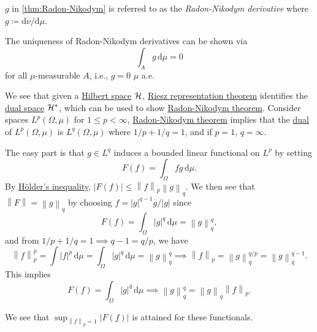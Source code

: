 \begin{notation}
	\(g\) in \autoref{thm:Radon-Nikodym} is referred to as the \emph{Radon-Nikodym derivative} where \(g \coloneqq \mathrm{d}\nu /\mathrm{d}\mu \).
	\begin{note}[Uniqueness]
		The uniqueness of Radon-Nikodym derivatives can be shown via
		\[
			\int _A g\,\mathrm{d} \mu = 0
		\]
		for all \(\mu \)-measurable \(A\), i.e., \(g=0\) \(\mu\) a.e.
	\end{note}
\end{notation}

\begin{remark}
	We see that given a \hyperref[def:Hilbert-space]{Hilbert space} \(\mathcal{\MakeUppercase{h}} \), \hyperref[thm:Riesz-representation]{Riesz representation theorem} identifies the \hyperref[def:dual-space]{dual space} \(\mathcal{\MakeUppercase{h}} ^{\ast} \), which can be used to show \hyperref[thm:Radon-Nikodym]{Radon-Nikodym theorem}. Consider spaces \(L^p(\Omega , \mu )\) for \(1 \leq p < \infty \), \hyperref[thm:Radon-Nikodym]{Radon-Nikodym theorem} implies that the \hyperref[def:dual-space]{dual} of \(L^p(\Omega , \mu )\) is \(L^q(\Omega , \mu )\) where \(1 / p + 1 / q = 1\), and if \(p = 1\), \(q = \infty \).
\end{remark}
\begin{explanation}
	The easy part is that \(g\in L^q\) induces a bounded linear functional on \(L^p\) by setting
	\[
		F(f) = \int _\Omega fg\,\mathrm{d} \mu.
	\]
	By \hyperref[lma:Holder-ineq]{Hölder's inequality}, \(\left\vert F(f) \right\vert \leq \left\lVert f\right\rVert _p \left\lVert g\right\rVert _q\). We then see that \(\left\lVert F\right\rVert = \left\lVert g\right\rVert _q\) by choosing \(f = \left\vert g \right\vert ^{q - 1}\overline{g} / \left\vert g \right\vert\) since
	\[
		F(f) = \int _\Omega \left\vert g \right\vert ^q\,\mathrm{d} \mu = \left\lVert g\right\rVert ^q_q,
	\]
	and from \(1 / p + 1 / q = 1 \implies q-1 = q / p\), we have
	\[
		\left\lVert f\right\rVert ^p_p = \int \left\vert f \right\vert ^p \,\mathrm{d} \mu= \int _\Omega \left\vert g \right\vert ^q\,\mathrm{d} \mu = \left\lVert g\right\rVert _q^q \implies \left\lVert f\right\rVert _p = \left\lVert g\right\rVert _q^{q / p} = \left\lVert g\right\rVert _q^{q - 1}.
	\]
	This implies
	\[
		F(f) = \int _\Omega \left\vert g \right\vert ^q\,\mathrm{d} \mu \implies \left\lVert g\right\rVert ^q_q = \left\lVert g\right\rVert _q \left\lVert f\right\rVert _p.
	\]
	\begin{note}
		We see that \(\sup _{\left\lVert f\right\rVert _p = 1} \left\vert F(f) \right\vert \) is attained for these functionals.
	\end{note}
\end{explanation}
